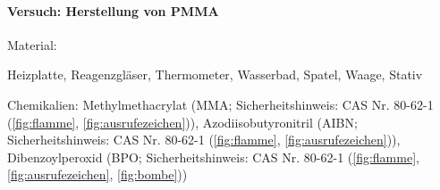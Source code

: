 \paragraph{Versuch: Herstellung von PMMA}

Material:
\begin{itemize*}
    \item Heizplatte, Reagenzgläser, Thermometer, Wasserbad, Spatel, Waage, Stativ
    \item Chemikalien: Methylmethacrylat (MMA; Sicherheitshinweis: CAS Nr. 80-62-1 (\autoref{fig:flamme}, \autoref{fig:ausrufezeichen})), Azodiisobutyronitril (AIBN; Sicherheitshinweis: CAS Nr. 80-62-1 (\autoref{fig:flamme}, \autoref{fig:ausrufezeichen})), Dibenzoylperoxid (BPO; Sicherheitshinweis: CAS Nr. 80-62-1 (\autoref{fig:flamme}, \autoref{fig:ausrufezeichen}, \autoref{fig:bombe}))
\end{itemize*}

